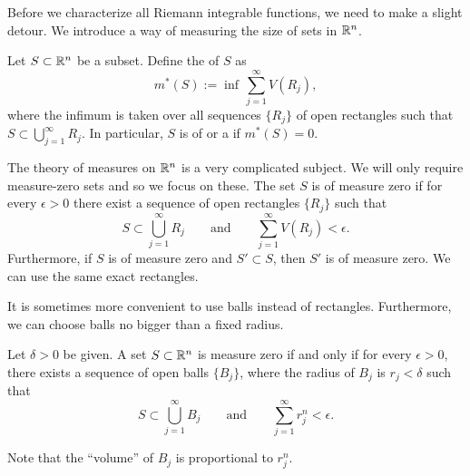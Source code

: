 Before we characterize all Riemann integrable functions, we need to make
a slight detour.  We introduce a way of measuring the size of sets in ${\mathbb{R}}^n$.

\begin{defn}
Let 
$S \subset {\mathbb{R}}^n$ be a subset.  Define the \emph{}
of $S$ as
\begin{equation*}
m^*(S)
:=
\inf\,
\sum_{j=1}^\infty V(R_j) ,
\end{equation*}
where the infimum is taken over all sequences
$\{ R_j \}$ of open rectangles such that
$S \subset \bigcup_{j=1}^\infty R_j$.
In particular, $S$ is of \emph{} or
a \emph{} if $m^*(S) = 0$.
\end{defn}

The theory of measures on ${\mathbb{R}}^n$ is a very complicated subject.
We will only require measure-zero sets and so we focus on these.
The set $S$ is of measure zero if
for every $\epsilon > 0$
there exist a sequence of open rectangles $\{ R_j \}$ such that
\begin{equation} \label{mv:eq:nullR}
S \subset \bigcup_{j=1}^\infty R_j \qquad \text{and} \qquad
\sum_{j=1}^\infty V(R_j) < \epsilon.
\end{equation}
Furthermore, 
if $S$ is of measure zero and $S' \subset S$, then
$S'$ is of measure zero.  We can use the same exact rectangles.

It is sometimes more convenient to use balls instead of rectangles.
Furthermore, we can
choose balls no bigger than a fixed radius.

\begin{prop} \label{mv:prop:ballsnull}
Let $\delta > 0$ be given.
A set $S \subset {\mathbb{R}}^n$ is measure zero if and only if for every $\epsilon >
0$, there exists a sequence of open balls $\{ B_j \}$, where the radius of
$B_j$ is $r_j < \delta$ such that
\begin{equation*}
S \subset \bigcup_{j=1}^\infty B_j \qquad \text{and} \qquad
\sum_{j=1}^\infty r_j^n < \epsilon.
\end{equation*}
\end{prop}

Note that the ``volume'' of $B_j$ is proportional to $r_j^n$.

